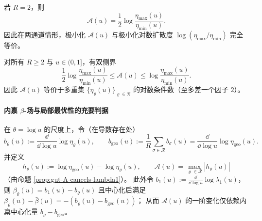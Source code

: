 \begin{corollary}[两通道坍缩]\label{cor:gut-A-two-channel}
若 \(R=2\)，则
\[
\mathcal{A}(u)=\frac12\log\frac{\eta_{\max}(u)}{\eta_{\min}(u)}.
\]
因此在两通道情形，极小化 \(\mathcal{A}(u)\) 与极小化对数扩散度 \(\log(\eta_{\max}/\eta_{\min})\) 完全等价。
\end{corollary}

\begin{corollary}\label{cor:gut-A-spread-equivalence}
对所有 \(R\ge 2\) 与 \(u\in(0,1]\)，有双侧界
\[
\frac12\log\frac{\eta_{\max}(u)}{\eta_{\min}(u)}
\le
\mathcal{A}(u)
\le
\log\frac{\eta_{\max}(u)}{\eta_{\min}(u)}.
\]
因此 \(\mathcal{A}(u)\) 等价于多重集 \(\{\eta_\varrho(u)\}_{\varrho\in\mathcal{R}}\) 的对数条件数（至多差一个因子 \(2\)）。
\end{corollary}

\paragraph{内禀 \texorpdfstring{$\beta$}{beta}-场与局部最优性的充要判据}
在 \(\theta=\log u\) 的尺度上，令（在导数存在处）
\[
b_\varrho(u):=\frac{\dd}{\dd\log u}\log\eta_\varrho(u),
\qquad
b_{\mathrm{geo}}(u):=\frac{1}{R}\sum_{\sigma\in\mathcal{R}}b_\sigma(u)
=\frac{\dd}{\dd\log u}\log\eta_{\mathrm{geo}}(u).
\]
并定义
\[
h_\varrho(u):=\log\eta_{\mathrm{geo}}(u)-\log\eta_\varrho(u),
\qquad
\mathcal{A}(u)=\max_{\varrho\in\mathcal{R}}|h_\varrho(u)|
\]
（由命题 \ref{prop:gut-A-cancels-lambda1}）。
此外令 \(b_1(u):=\frac{\dd}{\dd\log u}\log\lambda_1(u)\)，则
\(
\beta_\varrho(u)=b_1(u)-b_\varrho(u)
\)
且中心化后满足
\(
\beta_\varrho(u)-\bar\beta(u)=-(b_\varrho(u)-b_{\mathrm{geo}}(u))
\)；
从而 \(\mathcal{A}(u)\) 的一阶变化仅依赖内禀中心化量 \(b_\varrho-b_{\mathrm{geo}}\)。

